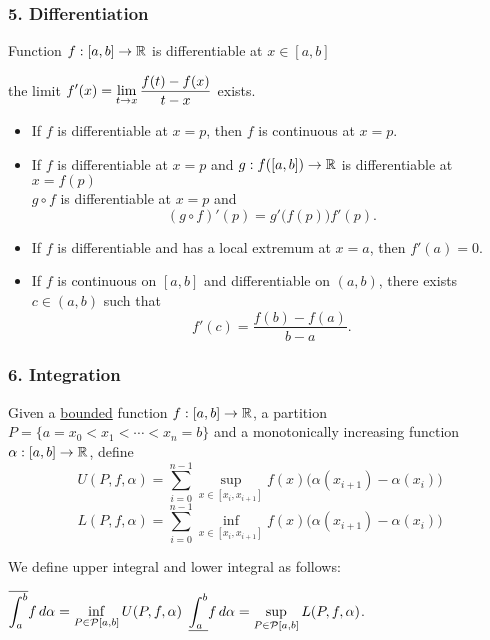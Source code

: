 \subsubsection*{5. Differentiation}

Function \(f: [a, b] \rightarrow \mathbb{R}\) is differentiable at \(x \in [a, b]\) \miff
\begin{center}
    the limit \(\displaystyle f'(x) = \lim_{t \rightarrow x} \frac{f(t) - f(x)}{t - x}\) exists.
\end{center}

\begin{itemize}
    \item If \(f\) is differentiable at \(x = p\), then \(f\) is continuous at \(x = p\).
    \item If \(f\) is differentiable at \(x = p\) and \(g: f([a, b]) \rightarrow \mathbb{R}\) is differentiable at \(x = f(p)\)\\
          \mimp \(g \circ f\) is differentiable at \(x = p\) and
          \[
              (g \circ f)'(p) = g'\big(f(p)\big)f'(p).
          \]
    \item {} If \(f\) is differentiable and has a local extremum at \(x = a\), then \(f'(a) = 0\).
    \item {} If \(f\) is continuous on \([a, b]\) and differentiable on \((a, b)\), there exists \(c \in (a, b)\) such that
          \[
              f'(c) = \frac{f(b)-f(a)}{b-a}.
          \]
\end{itemize}

\subsubsection*{6. Integration}

Given a \underline{bounded} function \(f: [a, b] \rightarrow \mathbb{R}\), a partition \(P = \{a = x_0 < x_1 < \cdots < x_n = b\}\) and a monotonically increasing function \(\alpha: [a, b] \rightarrow \mathbb{R}\), define
\[
    U(P, f, \alpha) = \sum_{i = 0}^{n - 1} \sup_{x \in [x_i, x_{i + 1}]} f(x) \bigl(\alpha(x_{i + 1}) - \alpha(x_{i})\bigr)
\]
\[
    L(P, f, \alpha) = \sum_{i = 0}^{n - 1} \inf_{x \in [x_i, x_{i + 1}]} f(x) \bigl(\alpha(x_{i + 1}) - \alpha(x_{i})\bigr)
\]

We define upper integral and lower integral as follows:
\begin{center}
    \(\displaystyle \overline{\int_{a}^{b}} f\,d{\alpha} = \inf_{P \in \mathcal{P}[a, b]} U(P, f, \alpha)\) \qquad \(\displaystyle \underline{\int_{a}^{b}} f\,d{\alpha} = \sup_{P \in \mathcal{P}[a, b]} L(P, f, \alpha)\).
\end{center}

